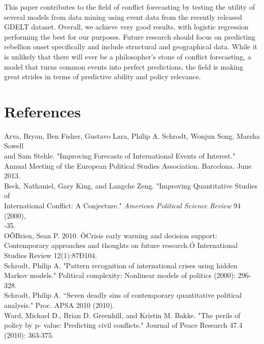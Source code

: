 \documentclass[12pt, letterpaper]{article}
\begin{document}
This paper contributes to the field of conflict forecasting by testing the utility of several models from data mining using event data from the recently released GDELT dataset. Overall, we achieve very good results, with logistic regression performing the best for our purposes. Future research should focus on predicting rebellion onset specifically and include structural and geographical data. While it is unlikely that there will ever be a philosopher's stone of conflict forecasting, a model that turns common events into perfect predictions, the field is making great strides in terms of predictive ability and policy relevance.

\section*{References}
\noindent Arva, Bryan, Ben Fisher, Gustavo Lara, Philip A. Schrodt, Wonjun Song, Marsha Sowell\\ 
\indent and Sam Stehle. "Improving Forecasts of International Events of Interest." Annual 
\indent Meeting of the European Political Studies Association. Barcelona. June 2013.\\
Beck, Nathaniel, Gary King, and Langche Zeng. "Improving Quantitative Studies of\\ 
\indent International Conflict: A Conjecture." \emph{American Political Science Review} 94 (2000),\\ -35.\\
\noindent OÕBrien, Sean P. 2010. ÒCrisis early warning and decision support: Contemporary approaches 
\indent and thoughts on future research.Ó International Studies Review 12(1):87Ð104.\\
\noindent Schrodt, Philip A. "Pattern recognition of international crises using hidden Markov models." 
\indent Political complexity: Nonlinear models of politics (2000): 296-328.\\
\noindent Schrodt, Philip A. ``Seven deadly sins of contemporary quantitative political analysis." 
\indent Proc. APSA 2010 (2010).\\
\noindent Ward, Michael D., Brian D. Greenhill, and Kristin M. Bakke. "The perils of policy by p-
\indent value: Predicting civil conflicts." Journal of Peace Research 47.4 (2010): 363-375.\\
\end{document}
